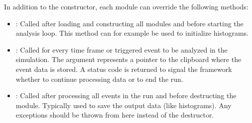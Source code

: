 In addition to the constructor, each module can override the following methods:
\begin{itemize}
\item {}: Called after loading and constructing all modules and before starting the analysis loop.
This method can for example be used to initialize histograms.
\item {}: Called for every time frame or triggered event to be analyzed in the simulation. The argument represents a pointer to the clipboard where the event data is stored.
A status code is returned to signal the framework whether to continue processing data or to end the run.
\item {}: Called after processing all events in the run and before destructing the module.
Typically used to save the output data (like histograms).
Any exceptions should be thrown from here instead of the destructor.
\end{itemize}
